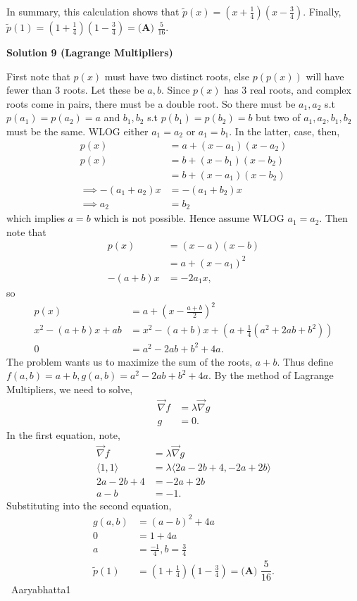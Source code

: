 \begin{enumerate}
 In summary, this calculation shows that $\tilde{p}(x)=\left(x+\frac{1}{4}\right)\left(x-\frac{3}{4}\right)$. Finally, $\tilde{p}(1)=\left(1+\frac{1}{4}\right)\left(1-\frac{3}{4}\right)=\boxed{\textbf{(A) } \frac{5}{16}}$.

 



\textbf{Solution 9 (Lagrange Multipliers)}

First note that $p(x)$ must have two distinct roots, else $p(p(x))$ will have fewer than $3$ roots. Let these be $a,b.$ Since $p(x)$ has $3$ real roots, and complex roots come in pairs, there must be a double root. So there must be $a_1, a_2$ s.t $p(a_1) = p(a_2) = a$ and $b_1, b_2$ s.t $p(b_1) = p(b_2) = b$ but two of $a_1, a_2, b_1, b_2$ must be the same. WLOG either $a_1 = a_2$ or $a_1 = b_1$. In the latter, case, then, 
 \begin{align*} p(x) &= a + (x - a_1)(x - a_2) \\ p(x) &= b + (x - b_1)(x-b_2) \\ &= b + (x - a_1)(x - b_2) \\ \implies -(a_1 + a_2)x &= -(a_1 + b_2)x \\ \implies a_2 &= b_2 \end{align*}
which implies $a = b$ which is not possible. Hence assume WLOG $a_1 = a_2.$ Then note that
 \begin{align*} p(x) &= (x-a)(x - b) \\  &= a + (x- a_1)^2 \\ -(a + b)x &= -2a_1x, \end{align*}
so
 \begin{align*} p(x) &= a + \left(x - \frac{a + b}{2}\right)^2 \\ x^2 - (a + b)x + ab &= x^2 - (a + b)x + \left(a + \frac{1}{4}(a^2 + 2ab + b^2)\right) \\ 0 &= a^2 - 2ab + b^2 + 4a. \end{align*}
The problem wants us to maximize the sum of the roots, $a + b.$ Thus define $f(a,b) = a + b, g(a,b) = a^2 - 2ab + b^2 + 4a.$ By the method of Lagrange Multipliers, we need to solve,
 \begin{align*} \vec{\nabla} f &= \lambda \vec{\nabla} g \\ g &= 0. \end{align*}
In the first equation, note,
 \begin{align*} \vec{\nabla} f &= \lambda \vec{\nabla} g \\ \langle 1, 1 \rangle &= \lambda \langle 2a - 2b + 4, -2a + 2b \rangle \\ 2a - 2b + 4 &= -2a + 2b \\ a - b &= -1. \end{align*}
Substituting into the second equation, 
 \begin{align*} g(a,b) &= (a-b)^2 + 4a \\ 0 &= 1 + 4a \\ a &= \frac{-1}{4}, b = \frac{3}{4} \\ \tilde{p}(1) &= \left(1 + \frac{1}{4}\right)\left(1 - \frac{3}{4}\right) = \boxed{\textbf{(A) } \dfrac{5}{16}}. \end{align*}
~Aaryabhatta1


\end{enumerate}
